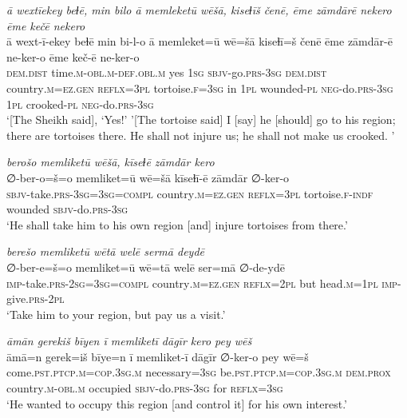 \ea \label{DG.64}
\textit{ā wextīekey beɫē, min bilo ā memleketū wēšā, kiseɫīš čenē, ēme zāmdārē nekero ēme kečē nekero} \\ 
\gll ā wext-ī-ekey beɫē min bi-l-o ā memleket=ū wē=šā kiseɫī=š čenē ēme zāmdār-ē ne-ker-o ēme keč-ē ne-ker-o \\ 
 \textsc{dem.dist} time\textsc{.m}\textsc{-obl}\textsc{.m}\textsc{-def}\textsc{.obl}\textsc{.m} yes \textsc{1sg} \textsc{sbjv-}go\textsc{.prs}\textsc{-3sg} \textsc{dem.dist} country\textsc{.m}\textsc{=ez}\textsc{.gen} \textsc{reflx}\textsc{=3pl} tortoise\textsc{\textsc{.f}}\textsc{=3sg} in \textsc{1pl} wounded\textsc{\textsc{-pl}} \textsc{neg-}do\textsc{.prs}\textsc{-3sg} \textsc{1pl} crooked\textsc{\textsc{-pl}} \textsc{neg-}do\textsc{.prs}\textsc{-3sg} \\ 
\glt `[The Sheikh said], ‘Yes!' '[The tortoise said] I [say] he [should] go to his region; there are tortoises there. He shall not injure us; he shall not make us crooked. '
\z 
 
\ea \label{DG.65}
\textit{berošo memliketū wēšā, kīseɫē zāmdār kero} \\ 
\gll ∅-ber-o=š=o memliket=ū wē=šā kīseɫī-ē zāmdār ∅-ker-o \\ 
 \textsc{sbjv-}take\textsc{.prs}\textsc{-3sg}\textsc{=3sg}\textsc{=\textsc{compl}} country\textsc{.m}\textsc{=ez}\textsc{.gen} \textsc{reflx}\textsc{=3pl} tortoise\textsc{\textsc{.f}}\textsc{-indf} wounded \textsc{sbjv-}do\textsc{.prs}\textsc{-3sg} \\ 
\glt `He shall take him to his own region [and] injure tortoises from there.'
\z 
 
\ea \label{DG.68}
\textit{berešo memliketū wētā welē sermā deydē} \\ 
\gll ∅-ber-e=š=o memliket=ū wē=tā welē ser=mā ∅-de-ydē \\ 
 \textsc{imp-}take\textsc{.prs}-\textsc{2sg}\textsc{=3sg}\textsc{=\textsc{compl}} country\textsc{.m}\textsc{=ez}\textsc{.gen} \textsc{reflx}\textsc{=2pl} but head\textsc{.m}\textsc{=1pl} \textsc{imp-}give\textsc{.prs}\textsc{-2pl} \\ 
\glt `Take him to your region, but pay us a visit.'
\z 
 
\ea \label{DP.5}
\textit{āmān gerekiš bīyen ī memliketī dāgīr kero pey wēš} \\ 
\gll āmā=n gerek=iš bīye=n ī memliket-ī dāgīr ∅-ker-o pey wē=š \\ 
 come\textsc{.pst}\textsc{.ptcp}\textsc{.m}\textsc{=cop}\textsc{.3sg}\textsc{.m} necessary\textsc{=3sg} be\textsc{.pst}\textsc{.ptcp}\textsc{.m}\textsc{=cop}\textsc{.3sg}\textsc{.m} \textsc{dem.prox} country\textsc{.m}\textsc{-obl}\textsc{.m} occupied \textsc{sbjv-}do\textsc{.prs}\textsc{-3sg} for \textsc{reflx}\textsc{=3sg} \\ 
\glt `He wanted to occupy this region [and control it] for his own interest.'
\z 
 

